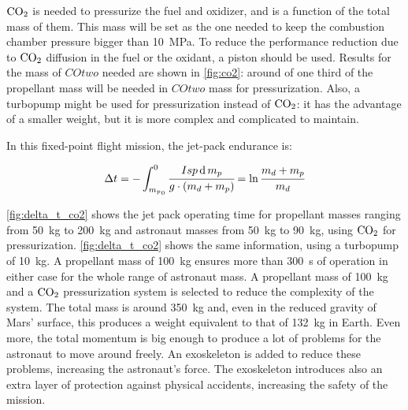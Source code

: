 \documentclass[twocolumn]{article}
\newcommand{\COtwo}{\textnormal{CO}_2}
\newcommand{\ud}{\operatorname{d}}
\begin{document}
$\COtwo$ is needed to pressurize the fuel and oxidizer, and is a function of 
the total mass of them. This mass will be set as the one needed to keep the 
combustion chamber pressure bigger than \SI{10}{\mega\pascal}. To reduce the 
performance reduction due to $\COtwo$ diffusion in the fuel or the oxidant, a 
piston should be used. Results for the mass of $COtwo$ needed are shown in 
\autoref{fig:co2}: around of one third of the propellant mass will be 
needed in $COtwo$ mass for pressurization. Also, a 
turbopump might be used for pressurization instead of $\COtwo$: it has the 
advantage of a smaller weight, but it is more complex and complicated to 
maintain.

In this fixed-point flight mission, the jet-pack endurance is:

\begin{equation}
  \Delta t = -\int_{{m_p}_0}^0 \cfrac{Isp \ud m_p}{g \cdot \left( m_d + m_p 
\right)} = \ln{\cfrac{m_d + m_p}{m_d}}
\end{equation}

\autoref{fig:delta_t_co2} shows the jet pack operating time for propellant 
masses ranging from \SI{50}{\kilogram} to \SI{200}{\kilogram} and astronaut 
masses from \SI{50}{\kilogram} to \SI{90}{\kilogram}, using $\COtwo$ for 
pressurization. \autoref{fig:delta_t_co2} shows the same information, using a 
turbopump of \SI{10}{\kilogram}. A propellant mass of \SI{100}{\kilogram} 
ensures more than \SI{300}{\second} of operation in either case for the whole 
range of astronaut mass. A propellant mass of \SI{100}{\kilogram} and a 
$\COtwo$ 
pressurization system is selected to reduce the complexity of the system. The 
total mass is around \SI{350}{\kilogram} and, even in the reduced gravity of 
Mars' surface, this produces a weight equivalent to that of \SI{132}{\kilogram} 
in Earth. Even more, the total momentum is big enough to produce a lot of 
problems for the astronaut to move around freely. An exoskeleton is added to 
reduce these problems, increasing the astronaut's force. The exoskeleton 
introduces also an extra layer of protection against physical accidents, 
increasing the safety of the mission.
\end{document}
